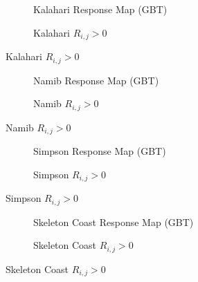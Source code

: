 \begin{figure}[H]
	\centering
	\begin{subfigure}{0.48\textwidth}
		\centering
		\caption{Kalahari Response Map (GBT)}
		\label{fig:kalahari_gbt_response}
	\end{subfigure}
	\begin{subfigure}{0.48\textwidth}
		\centering
		\caption{ Kalahari $R_{i,j} > 0$}
		\label{fig:kalahari_gbt_response_overlay}
	\end{subfigure}
\end{figure}
\begin{figure}[H]
	\ContinuedFloat
	\centering
	\begin{subfigure}{0.48\textwidth}
		\centering
		\caption{Namib Response Map (GBT)}
		\label{fig:namib_gbt_response}
	\end{subfigure}
	\begin{subfigure}{0.48\textwidth}
		\centering
		\caption{ Namib $R_{i,j} > 0$}
		\label{fig:namib_gbt_response_overlay}
	\end{subfigure}
\end{figure}
\begin{figure}[H]
	\ContinuedFloat
	\centering
	\begin{subfigure}{0.48\textwidth}
		\centering
		\caption{Simpson Response Map (GBT)}
		\label{fig:simpson_gbt_response}
	\end{subfigure}
	\begin{subfigure}{0.48\textwidth}
		\centering
		\caption{ Simpson $R_{i,j} > 0$}
		\label{fig:simpson_gbt_response_overlay}
	\end{subfigure}
\end{figure}
\begin{figure}[H]
	\ContinuedFloat
	\centering
	\begin{subfigure}{0.48\textwidth}
		\centering
		\caption{Skeleton Coast Response Map (GBT)}
		\label{fig:SkeletonCoast_gbt_response}
	\end{subfigure}
	\begin{subfigure}{0.48\textwidth}
		\centering
		\caption{ Skeleton Coast $R_{i,j} > 0$}
		\label{fig:SkeletonCoast_gbt_response_overlay}
	\end{subfigure}
\end{figure}
